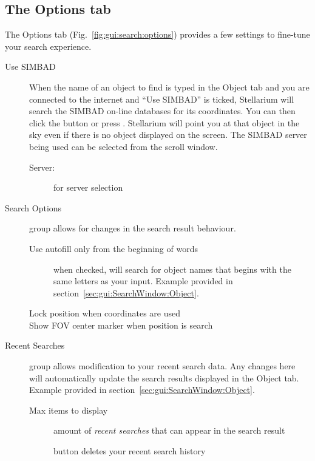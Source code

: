 \subsection{The Options tab}
\label{sec:gui:SearchWindow:Options}
The Options tab (Fig.~\ref{fig:gui:search:options}) provides a few settings to fine-tune your search experience.

\begin{description}
\item[Use SIMBAD]
When the name of an object to find is typed in the Object
tab and you are connected to the internet and ``Use SIMBAD'' is
ticked, Stellarium will search the SIMBAD on-line databases for its
coordinates. You can then click the  button or press \key{\return}.
Stellarium will point you at that object in the sky even if there is no
object displayed on the screen. The SIMBAD server being used can be
selected from the scroll window.
\begin{description}
\item[Server:] for server selection
\end{description}
\end{description}

\begin{description}
\item[Search Options] group allows for changes in the search result behaviour.
\begin{description}
\item[Use autofill only from the beginning of words] when checked, will 
search for object names that begins with the same letters as your input. 
Example provided in section~\ref{sec:gui:SearchWindow:Object}. 
\item[Lock position when coordinates are used]
\item[Show FOV center marker when position is search]
\end{description}        
\end{description}

\begin{description}
\item[Recent Searches]group allows modification to your recent search data. 
Any changes here will automatically update the search results displayed in the Object tab. 
Example provided in section~\ref{sec:gui:SearchWindow:Object}.
\begin{description}
\item[Max items to display] amount of \emph{recent searches} that can appear in the search result
\item[] button deletes your recent search history
\end{description}
\end{description}

